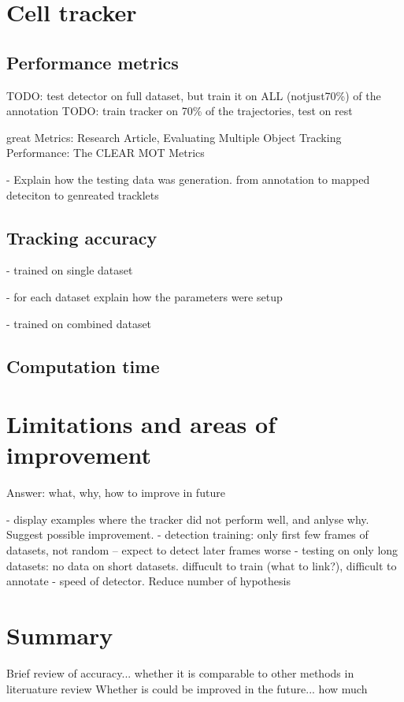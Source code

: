 	
\section{Cell tracker \statusnew}
	\label{sec:results_tracker}
	\subsection{Performance metrics \statusnew}
	
	TODO: test detector on full dataset, but train it on ALL (notjust70\%) of the annotation
	TODO: train tracker on 70\% of the trajectories, test on rest
	
	great Metrics: Research Article, Evaluating Multiple Object Tracking Performance: The CLEAR MOT Metrics
	
	- Explain how the testing data was generation. from annotation to mapped deteciton to genreated tracklets

	\subsection{Tracking accuracy \statusnew}
		- trained on single dataset
		
		- for each dataset explain how the parameters were setup
					
		- trained on combined dataset
	\subsection{Computation time \statusnew}
\section{Limitations and areas of improvement \statusnew}
	\label{sec:results_limitations}
	Answer: what, why, how to improve in future
			
	- display examples where the tracker did not perform well, and anlyse why. Suggest possible improvement.
	- detection training: only first few frames of datasets, not random -- expect to detect later frames worse
	- testing on only long datasets: no data on short datasets. diffucult to train (what to link?), difficult to annotate
	- speed of detector. Reduce number of hypothesis		

\section{Summary \statusnew}
	\label{sec:results_summary}
	Brief review of accuracy... whether it is comparable to other methods in literuature review
	Whether is could be improved in the future... how much